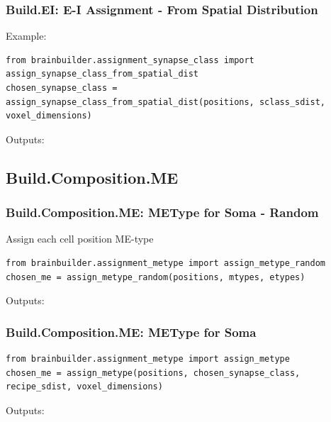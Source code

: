 \documentclass{beamer}
\begin{document}
\begin{frame}[fragile]
  \frametitle{Build.EI: E-I Assignment - From Spatial Distribution}
  Example:
\begin{lstlisting}
from brainbuilder.assignment_synapse_class import assign_synapse_class_from_spatial_dist
chosen_synapse_class = assign_synapse_class_from_spatial_dist(positions, sclass_sdist, voxel_dimensions)
\end{lstlisting}
  Outputs:
\end{frame}

\subsection{Build.Composition.ME}
\begin{frame}[fragile]
  \frametitle{Build.Composition.ME: METype for Soma - Random}
  Assign each cell position ME-type
\begin{lstlisting}
from brainbuilder.assignment_metype import assign_metype_random
chosen_me = assign_metype_random(positions, mtypes, etypes)
\end{lstlisting}
  Outputs:
\end{frame}

\begin{frame}[fragile]
  \frametitle{Build.Composition.ME: METype for Soma}
\begin{lstlisting}
from brainbuilder.assignment_metype import assign_metype
chosen_me = assign_metype(positions, chosen_synapse_class, recipe_sdist, voxel_dimensions)
\end{lstlisting}
  Outputs:
\end{frame}
\end{document}
